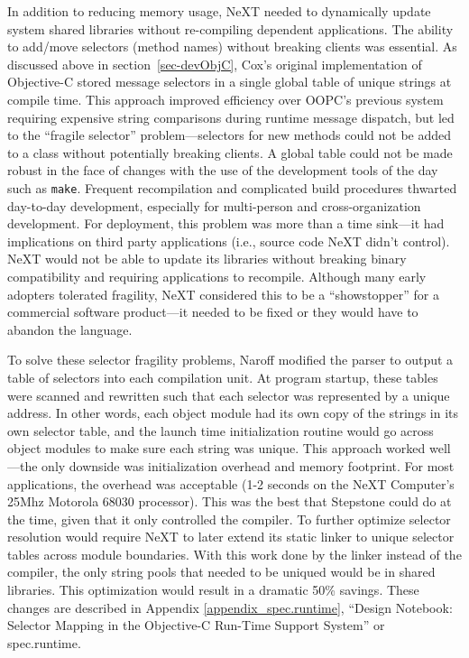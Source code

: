 \documentclass[acmsmall]{acmart}\settopmatter{}
\begin{document}
In addition to reducing memory usage, NeXT needed to dynamically update system shared libraries without re-compiling dependent applications. The ability to add/move selectors (method names) without breaking clients was essential. As discussed above in section~\ref{sec-devObjC}, Cox's original implementation of Objective-C stored message selectors in a single global table of unique strings at compile time. This approach improved efficiency over OOPC's previous system requiring expensive string comparisons during runtime message dispatch, but led to the ``fragile selector'' problem---selectors for new methods could not be added to a class without potentially breaking clients. A global table could not be made robust in the face of changes with the use of the development tools of the day such as \verb$make$. Frequent recompilation and complicated build procedures thwarted day-to-day development, especially for multi-person and cross-organization development. For deployment, this problem was more than a time sink---it had implications on third party applications (i.e., source code NeXT didn't control). NeXT would not be able to update its libraries without breaking binary compatibility and requiring applications to recompile. Although many early adopters tolerated fragility, NeXT considered this to be a ``showstopper'' for a commercial software product---it needed to be fixed or they would have to abandon the language.

To solve these selector fragility problems, Naroff modified the parser to output a table of selectors into each compilation unit. At program startup, these tables were scanned and rewritten such that each selector was represented by a unique address. In other words, each object module had its own copy of the strings in its own selector table, and the launch time initialization routine would go across object modules to make sure each string was unique. This approach worked well---the only downside was initialization overhead and memory footprint. For most applications, the overhead was acceptable (1-2 seconds on the NeXT Computer's 25Mhz Motorola 68030 processor). This was the best that Stepstone could do at the time, given that it only controlled the compiler. To further optimize selector resolution would require NeXT to later extend its static linker to unique selector tables across module boundaries. With this work done by the linker instead of the compiler, the only string pools that needed to be uniqued would be in shared libraries. This optimization would result in a dramatic 50\% savings. These changes are described in Appendix \ref{appendix_spec.runtime}, ``Design Notebook: Selector Mapping in the Objective-C Run-Time Support System'' or spec.runtime. 
\end{document}

